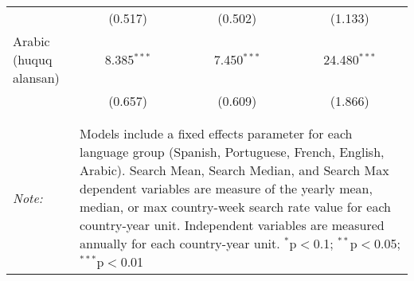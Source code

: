 \begin{table}[!htbp]
\begin{tabular}{@{\extracolsep{5pt}}lccc}
  & (0.517) & (0.502) & (1.133) \\ 
  Arabic (huquq alansan) & 8.385$^{***}$ & 7.450$^{***}$ & 24.480$^{***}$ \\ 
  & (0.657) & (0.609) & (1.866) \\ 
 \hline \\[-1.8ex] 
\hline 
\hline \\[-1.8ex] 
\textit{Note:}  & \multicolumn{3}{l}{\parbox[t]{8cm}{Models include a fixed effects parameter for each language group (Spanish, Portuguese, French, English, Arabic). Search Mean, Search Median, and Search Max dependent variables are measure of the yearly mean, median, or max country-week search rate value for each country-year unit. Independent variables are measured annually for each country-year unit. $^{*}$p$<$0.1; $^{**}$p$<$0.05; $^{***}$p$<$0.01}} \\ 
\end{tabular} 
\end{table} 
